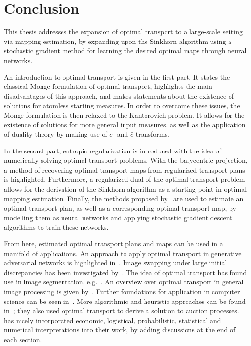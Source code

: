 \chapter*{Conclusion}

This thesis addresses the expansion of optimal transport to a large-scale setting via mapping estimation, by expanding upon the Sinkhorn algorithm using a stochastic gradient method for learning the desired optimal maps through neural networks.

An introduction to optimal transport is given in the first part. It states the classical Monge formulation of optimal transport, highlights the main disadvantages of this approach, and makes statements about the existence of solutions for atomless starting measures. In order to overcome these issues, the Monge formulation is then relaxed to the Kantorovich problem. It allows for the existence of solutions for more general input measures, as well as the application of duality theory by making use of $c$- and $\bar{c}$-transforms.

In the second part, entropic regularization is introduced with the idea of numerically solving optimal transport problems. With the barycentric projection, a method of recovering optimal transport maps from regularized transport plans is highlighted. Furthermore, a regularized dual of the optimal transport problem allows for the derivation of the Sinkhorn algorithm as a starting point in optimal mapping estimation. Finally, the methods proposed by\ \cite{Seg2018} are used to estimate an optimal transport plan, as well as a corresponding optimal transport map, by modelling them as neural networks and applying stochastic gradient descent algorithms to train these networks.

From here, estimated optimal transport plans and maps can be used in a manifold of applications. An approach to apply optimal transport in generative adversarial networks is highlighted in\ \cite{Sal2018}. Image swapping under large initial discrepancies has been investigated by\ \cite{Zhu2020}. The idea of optimal transport has found use in image segmentation, e.g.\ \cite{Rabin2015}. An overview over optimal transport in general image processing is given by\ \cite{Papa2015}. Further foundations for application in computer science can be seen in\ \cite{Levy2017}. More algorithmic and heuristic approaches can be found in~\cite{Pey2019}; they also used optimal transport to derive a solution to auction processes.\ \cite{San2015} has nicely incorporated economic, logistical, probabilistic, statistical and numerical interpretations into their work, by adding discussions at the end of each section.

